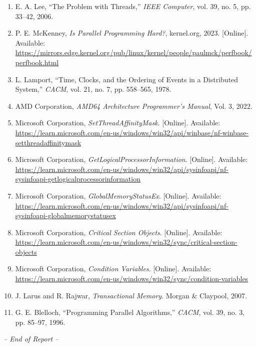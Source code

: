 \documentclass[12pt,a4paper]{article}
\begin{document}
\begin{enumerate}
  \item E. A. Lee, ``The Problem with Threads,'' \textit{IEEE Computer}, vol. 39, no. 5, pp. 33--42, 2006.
  \item P. E. McKenney, \textit{Is Parallel Programming Hard?}, kernel.org, 2023. [Online]. Available: \url{https://mirrors.edge.kernel.org/pub/linux/kernel/people/paulmck/perfbook/perfbook.html}
  \item L. Lamport, ``Time, Clocks, and the Ordering of Events in a Distributed System,'' \textit{CACM}, vol. 21, no. 7, pp. 558--565, 1978.
  \item AMD Corporation, \textit{AMD64 Architecture Programmer's Manual}, Vol. 3, 2022.
  \item Microsoft Corporation, \textit{SetThreadAffinityMask}. [Online]. Available: \url{https://learn.microsoft.com/en-us/windows/win32/api/winbase/nf-winbase-setthreadaffinitymask}
  \item Microsoft Corporation, \textit{GetLogicalProcessorInformation}. [Online]. Available: \url{https://learn.microsoft.com/en-us/windows/win32/api/sysinfoapi/nf-sysinfoapi-getlogicalprocessorinformation}
  \item Microsoft Corporation, \textit{GlobalMemoryStatusEx}. [Online]. Available: \url{https://learn.microsoft.com/en-us/windows/win32/api/sysinfoapi/nf-sysinfoapi-globalmemorystatusex}
  \item Microsoft Corporation, \textit{Critical Section Objects}. [Online]. Available: \url{https://learn.microsoft.com/en-us/windows/win32/sync/critical-section-objects}
  \item Microsoft Corporation, \textit{Condition Variables}. [Online]. Available: \url{https://learn.microsoft.com/en-us/windows/win32/sync/condition-variables}
  \item J. Larus and R. Rajwar, \textit{Transactional Memory}. Morgan \& Claypool, 2007.
  \item G. E. Blelloch, ``Programming Parallel Algorithms,'' \textit{CACM}, vol. 39, no. 3, pp. 85--97, 1996.
\end{enumerate}

\vfill
\begin{center}
  \small\textit{-- End of Report --}
\end{center}
\end{document}
